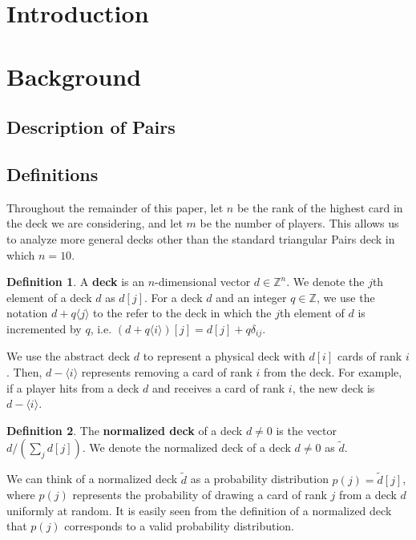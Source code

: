 \documentclass{article}
\theoremstyle{definition}
\newtheorem{definition}{Definition}
\newcounter{a}
\begin{document}
\section{Introduction}

\section{Background}

\subsection{Description of Pairs}

\subsection{Definitions}

Throughout the remainder of this paper, let $n$ be the rank of the highest card in the deck we are considering, and let $m$ be the number of players. This allows us to analyze more general decks other than the standard triangular Pairs deck in which $n=10$.

\begin{definition}
A \textbf{deck} is an $n$-dimensional vector $d \in \mathbb{Z}^n$. We denote the $j$th element of a deck $d$ as $d[j]$. For a deck $d$ and an integer $q \in \mathbb{Z}$, we use the notation $d+q\langle j \rangle$ to the refer to the deck in which the $j$th element of $d$ is incremented by $q$, i.e. $(d + q \langle i \rangle)[j] = d[j] + q\delta_{ij}$.
\end{definition}

We use the abstract deck $d$ to represent a physical deck with $d[i]$ cards of rank $i$. Then, $d-\langle i \rangle$ represents removing a card of rank $i$ from the deck. For example, if a player hits from a deck $d$ and receives a card of rank $i$, the new deck is $d-\langle i \rangle$.

\begin{definition}
The \textbf{normalized deck} of a deck $d \neq 0$ is the vector $d / \left(\sum_j d[j]\right)$. We denote the normalized deck of a deck $d \neq 0$ as $\tilde{d}$.
\end{definition}

We can think of a normalized deck $\tilde{d}$ as a probability distribution $p(j) = \tilde{d}[j]$, where $p(j)$ represents the probability of drawing a card of rank $j$ from a deck $d$ uniformly at random. It is easily seen from the definition of a normalized deck that $p(j)$ corresponds to a valid probability distribution.
\end{document}
